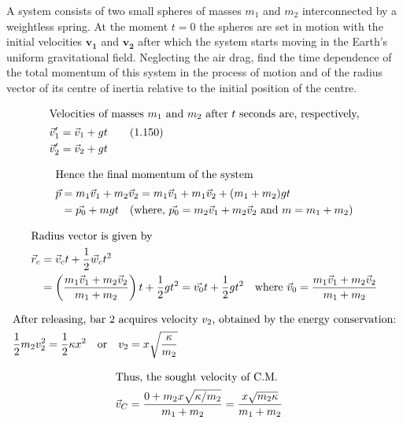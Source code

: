 \item A system consists of two small spheres of masses \( m_1 \) and \( m_2 \) interconnected by a weightless spring. At the moment \( t = 0 \) the spheres are set in motion with the initial velocities \( \mathbf{v_1} \) and \( \mathbf{v_2} \) after which the system starts moving in the Earth's uniform gravitational field. Neglecting the air drag, find the time dependence of the total momentum of this system in the process of motion and of the radius vector of its centre of inertia relative to the initial position of the centre.

\begin{solution}
    \begin{center}
    \end{center}
    
    \begin{align*}
        \intertext{Velocities of masses $m_1$ and $m_2$ after $t$ seconds are, respectively,}
        \vec{v}_1' &= \vec{v}_1 + gt \tag{1.150}\\
        \vec{v}_2' &= \vec{v}_2 + gt
    \end{align*}
    
    \begin{align*}
        \intertext{Hence the final momentum of the system}
        \vec{p} &= m_1 \vec{v}_1 + m_2 \vec{v}_2 = m_1 \vec{v}_1 + m_1 \vec{v}_2 + (m_1 + m_2)gt\\
        &= \vec{p_0} + mgt \quad (\text{where, } \vec{p_0} = m_2 \vec{v}_1 + m_2 \vec{v}_2 \text{ and } m = m_1 + m_2)
    \end{align*}
    
    \begin{align*}
        \intertext{Radius vector is given by}
        \vec{r}_c &= \vec{v}_c t + \dfrac{1}{2} \vec{w}_c t^2\\
        &= \left( \dfrac{m_1 \vec{v}_1 + m_2 \vec{v}_2}{m_1 + m_2} \right)t + \dfrac{1}{2} gt^2 = \vec{v_0} t + \dfrac{1}{2} gt^2 \quad \text{where } \vec{v}_0 = \dfrac{m_1 \vec{v}_1 + m_2 \vec{v}_2}{m_1 + m_2}
    \end{align*}
    
    \begin{align*}
        \intertext{After releasing, bar 2 acquires velocity $v_2$, obtained by the energy conservation:}
        \dfrac{1}{2} m_2 v_2^2 &= \dfrac{1}{2} \kappa x^2 \quad \text{or} \quad v_2 = x \sqrt{\dfrac{\kappa}{m_2}}
    \end{align*}
    
    \begin{align*}
        \intertext{Thus, the sought velocity of C.M.}
        \vec{v}_C &= \dfrac{0 + m_2 x \sqrt{\kappa / m_2}}{m_1 + m_2} = \dfrac{x \sqrt{m_2 \kappa}}{m_1 + m_2}
    \end{align*}
\end{solution}
